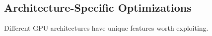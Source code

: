 \subsection{Architecture-Specific Optimizations}

Different GPU architectures have unique features worth exploiting.

